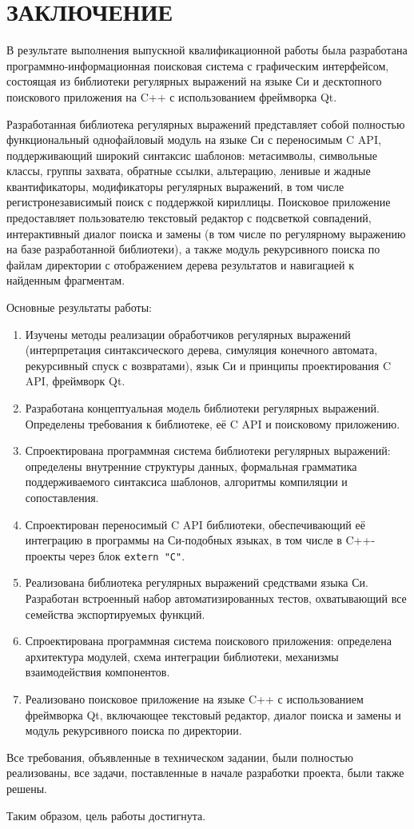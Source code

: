 \section*{ЗАКЛЮЧЕНИЕ}

В результате выполнения выпускной квалификационной работы была разработана программно-информационная поисковая система с графическим интерфейсом, состоящая из библиотеки регулярных выражений на языке Си и десктопного поискового приложения на C++ с использованием фреймворка Qt.

Разработанная библиотека регулярных выражений представляет собой полностью функциональный однофайловый модуль на языке Си с переносимым C API, поддерживающий широкий синтаксис шаблонов: метасимволы, символьные классы, группы захвата, обратные ссылки, альтерацию, ленивые и жадные квантификаторы, модификаторы регулярных выражений, в том числе регистронезависимый поиск с поддержкой кириллицы. Поисковое приложение предоставляет пользователю текстовый редактор с подсветкой совпадений, интерактивный диалог поиска и замены (в том числе по регулярному выражению на базе разработанной библиотеки), а также модуль рекурсивного поиска по файлам директории с отображением дерева результатов и навигацией к найденным фрагментам.

Основные результаты работы:
\begin{enumerate}
	\item Изучены методы реализации обработчиков регулярных выражений (интерпретация синтаксического дерева, симуляция конечного автомата, рекурсивный спуск с возвратами), язык Си и принципы проектирования C API, фреймворк Qt.
	\item Разработана концептуальная модель библиотеки регулярных выражений. Определены требования к библиотеке, её C API и поисковому приложению.
	\item Спроектирована программная система библиотеки регулярных выражений: определены внутренние структуры данных, формальная грамматика поддерживаемого синтаксиса шаблонов, алгоритмы компиляции и сопоставления.
	\item Спроектирован переносимый C API библиотеки, обеспечивающий её интеграцию в программы на Си-подобных языках, в том числе в C++-проекты через блок \verb`extern "C"`.
	\item Реализована библиотека регулярных выражений средствами языка Си. Разработан встроенный набор автоматизированных тестов, охватывающий все семейства экспортируемых функций.
	\item Спроектирована программная система поискового приложения: определена архитектура модулей, схема интеграции библиотеки, механизмы взаимодействия компонентов.
	\item Реализовано поисковое приложение на языке C++ с использованием фреймворка Qt, включающее текстовый редактор, диалог поиска и замены и модуль рекурсивного поиска по директории.
\end{enumerate}

Все требования, объявленные в техническом задании, были полностью реализованы, все задачи, поставленные в начале разработки проекта, были также решены.

Таким образом, цель работы достигнута.